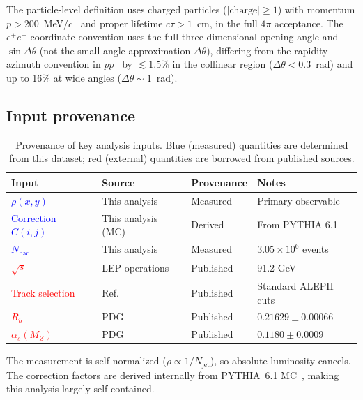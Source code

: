 \documentclass[11pt,a4paper]{article}
\newcommand{\measured}[1]{\textcolor{blue}{#1}}
\newcommand{\external}[1]{\textcolor{red}{#1}}
\begin{document}
The particle-level definition uses charged particles ($|\text{charge}|
\ge 1$) with momentum $p > 200$~MeV/$c$~\cite{ALEPH:1998hhr,ALEPH:1998vtv}
and proper lifetime $c\tau > 1$~cm, in the full $4\pi$ acceptance.
The $e^+e^-$ coordinate convention uses the full three-dimensional
opening angle and $\sin\Delta\theta$ (not the small-angle approximation
$\Delta\theta$), differing from the rapidity--azimuth convention in
$pp$~\cite{Dreyer:2018nbf} by $\lesssim\!1.5\%$ in the collinear
region ($\Delta\theta < 0.3$~rad) and up to 16\% at wide angles
($\Delta\theta \sim 1$~rad).

\subsection{Input provenance}
\label{sec:provenance}

\begin{table}[htbp]
\centering
\caption{Provenance of key analysis inputs.  Blue (measured) quantities
  are determined from this dataset; red (external) quantities are borrowed
  from published sources.}
\label{tbl:provenance}
\begin{tabular}{llll}
\toprule
Input & Source & Provenance & Notes \\
\midrule
\measured{$\rho(x,y)$} & This analysis & Measured & Primary observable \\
\measured{Correction $C(i,j)$} & This analysis (MC) & Derived & From PYTHIA 6.1 \\
\measured{$N_\text{had}$} & This analysis & Measured & $3.05 \times 10^6$ events \\
\external{$\sqrt{s}$} & LEP operations & Published & 91.2 GeV \\
\external{Track selection} & Ref.~\cite{ALEPH:1998hhr,ALEPH:1998vtv} & Published & Standard ALEPH cuts \\
\external{$R_b$} & PDG~\cite{ParticleDataGroup:2024cfk} & Published & $0.21629 \pm 0.00066$ \\
\external{$\alpha_s(M_Z)$} & PDG~\cite{ParticleDataGroup:2024cfk} & Published & $0.1180 \pm 0.0009$ \\
\bottomrule
\end{tabular}
\end{table}

The measurement is self-normalized ($\rho \propto 1/N_\text{jet}$),
so absolute luminosity cancels.  The correction factors are
derived internally from PYTHIA~6.1 MC~\cite{Sjostrand:2000wi},
making this analysis largely self-contained.
\end{document}
